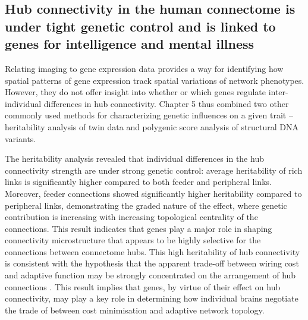 \subsection*{Hub connectivity in the human connectome is under tight genetic control and is linked to genes for intelligence and mental illness}

Relating imaging to gene expression data provides a way for identifying how spatial patterns of gene expression track spatial variations of network phenotypes. However, they do not offer insight into whether or which genes regulate inter-individual differences in hub connectivity. Chapter 5 thus combined two other commonly used methods for characterizing genetic influences on a given trait -- heritability analysis of twin data and polygenic score analysis of structural DNA variants.

The heritability analysis revealed that individual differences in the hub connectivity strength are under strong genetic control: average heritability of  rich links is significantly higher compared to both feeder and peripheral links. Moreover, feeder connections showed significantly higher heritability compared to peripheral links, demonstrating the graded nature of the effect, where genetic contribution is increasing with increasing topological centrality of the connections. This result indicates that genes play a major role in shaping connectivity microstructure that appears to be highly selective for the connections between connectome hubs. This high heritability of hub connectivity is consistent with the hypothesis that the apparent trade-off between wiring cost and adaptive function may be strongly concentrated on the arrangement of hub connections \mbox{\citep{Bullmore2012}}. This result implies that genes, by virtue of their effect on hub connectivity, may play a key role in determining how individual brains negotiate the trade of between cost minimisation and adaptive network topology.

